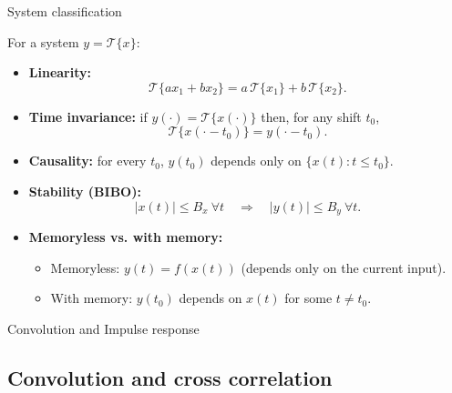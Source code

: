 \documentclass[aspectratio=169]{beamer}
\begin{document}
\begin{frame}{System classification}
\small

For a system $y=\mathcal{T}\{x\}$:
\begin{itemize}
  \item \textbf{Linearity:}
  \[
    \mathcal{T}\{a x_1 + b x_2\}=a\,\mathcal{T}\{x_1\}+b\,\mathcal{T}\{x_2\}.
  \]

  \item \textbf{Time invariance:} if $y(\cdot)=\mathcal{T}\{x(\cdot)\}$ then, for any shift $t_0$,
  \[
    \mathcal{T}\{x(\cdot-t_0)\}=y(\cdot-t_0).
  \]

  \item \textbf{Causality:} for every $t_0$, $y(t_0)$ depends only on $\{x(t):t\le t_0\}$.


  \item \textbf{Stability (BIBO):}
  \[
    |x(t)|\le B_x\ \forall t\quad\Rightarrow\quad |y(t)|\le B_y\ \forall t.
  \]

  \item \textbf{Memoryless vs. with memory:}
  \begin{itemize}
    \item Memoryless: $y(t)=f(x(t))$ (depends only on the current input).
    \item With memory: $y(t_0)$ depends on $x(t)$ for some $t\neq t_0$.
  \end{itemize}
\end{itemize}

\end{frame}






\begin{frame}[plain]
    \centering
    \vfill
    {Convolution and Impulse response \par}
    \vfill
  \end{frame}

\subsection{Convolution and cross correlation}
\end{document}
